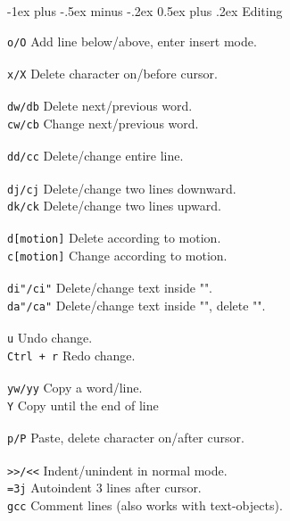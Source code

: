 \documentclass[10pt,landscape]{article}
\makeatletter
\renewcommand{\section}{\@startsection{section}{1}{0mm}%
                                {-1ex plus -.5ex minus -.2ex}%
                                {0.5ex plus .2ex}%
                                {\normalfont\large\bfseries}}
\makeatother
\begin{document}
\begin{multicols}{3}
\section{Editing}

\verb!o/O! \hfill Add line below/above, enter insert mode.\\
\verb! ! \\
\verb!x/X! \hfill Delete character on/before cursor.\\
\verb! !\\
\verb!dw/db! \hfill Delete next/previous word.\\
\verb!cw/cb! \hfill Change next/previous word.\\
\verb! !\\
\verb!dd/cc! \hfill Delete/change entire line.\\
\verb! !\\
\verb!dj/cj! \hfill Delete/change two lines downward.\\
\verb!dk/ck! \hfill Delete/change two lines upward.\\
\verb! !\\
\verb!d[motion]! \hfill Delete according to motion.\\
\verb!c[motion]! \hfill Change according to motion.\\
\verb! !\\
\verb!di"/ci"! \hfill Delete/change text inside "".\\
\verb!da"/ca"! \hfill Delete/change text inside "", delete "".\\
\verb! ! \\
\verb!u! \hfill Undo change.\\
\verb!Ctrl + r! \hfill Redo change.\\
\verb! !\\
\verb!yw/yy! \hfill Copy a word/line.\\
\verb!Y! \hfill Copy until the end of line \\
\verb! ! \\
\verb!p/P! \hfill Paste, delete character on/after cursor.\\
\verb! !\\
\verb!>>/<<! \hfill Indent/unindent in normal mode.\\
\verb!=3j! \hfill Autoindent 3 lines after cursor.\\
\verb!gcc! \hfill Comment lines (also works with text-objects).\\

\verb! !\\
\verb! !\\
\verb! !\\
\verb! !\\


\end{multicols}
\end{document}
